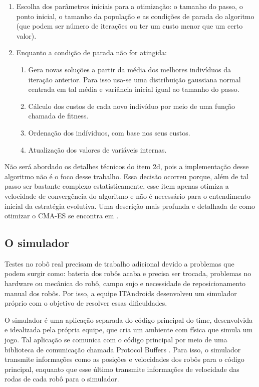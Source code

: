 \documentclass[10pt,fleqn,a4paper]{article}
\begin{document}
\begin{enumerate}
\item Escolha dos parâmetros iniciais para a otimização: o tamanho do passo, o ponto inicial, o tamanho da população e as condições de parada do algoritmo (que podem ser número de iterações ou ter um custo menor que um certo valor).
\item Enquanto a condição de parada não for atingida:
\begin{enumerate}
\item Gera novas soluções a partir da média dos melhores indivíduos da iteração anterior. Para isso usa-se uma distribuição gaussiana normal centrada em tal média e variância inicial igual ao tamanho do passo.
\item Cálculo dos custos de cada novo indivíduo por meio de uma função chamada de fitness.
\item Ordenação dos indíviduos, com base nos seus custos.
\item Atualização dos valores de variáveis internas.
\end{enumerate}
\end{enumerate}

Não será abordado os detalhes técnicos do item 2d, pois a implementação desse algoritmo não é o foco desse trabalho. Essa decisão ocorreu porque, além de tal passo ser bastante complexo estatisticamente, esse item apenas otimiza a velocidade de convergência do algoritmo e não é necessário para o entendimento inicial da estratégia evolutiva. Uma descrição mais profunda e detalhada de como otimizar o CMA-ES se encontra em \cite{CMA-ES}.

\subsection{O simulador}

Testes no robô real precisam de trabalho adicional devido a problemas que podem surgir como: bateria dos robôs acaba e precisa ser trocada, problemas no hardware ou mecânica do robô, campo sujo e necessidade de reposicionamento manual dos robôs. Por isso, a equipe ITAndroids desenvolveu um simulador próprio com o objetivo de resolver essas dificuldades.

O simulador é uma aplicação separada do código principal do time, desenvolvida e idealizada pela própria equipe, que cria um ambiente com física que simula um jogo. Tal aplicação se comunica com o código principal por meio de uma biblioteca de comunicação chamada Protocol Buffers \cite{protobuf}. Para isso, o simulador transmite informações como as posições e velocidades dos robôs para o código principal, enquanto que esse último transmite informações de velocidade das rodas de cada robô para o simulador.
\end{document}

